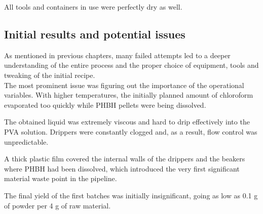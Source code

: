 \documentclass{article}
\begin{document}
        All tools and containers in use were perfectly dry as well. 



        \subsection{Initial results and potential issues\label{initial_failures}}

        As mentioned in previous chapters, many failed attempts led to a deeper understanding of the entire process 
        and the proper choice of equipment, tools and tweaking of the initial recipe. \\ 

        The most prominent issue was figuring out the importance of the operational variables. With higher temperatures, the initially planned amount of chloroform evaporated too 
        quickly while PHBH pellets were being dissolved. 

        The obtained liquid was extremely viscous and hard to drip effectively into the PVA solution. Drippers were constantly clogged
        and, as a result, flow control was unpredictable. 
        
        A thick plastic film covered the internal walls of the drippers and the beakers where PHBH had been dissolved, which 
        introduced the very first significant material waste point in the pipeline. 


        The final yield of the first batches was initially insignificant, going as low as 0.1 g of powder 
        per 4 g of raw material. \\ 
        
%
\end{document}
